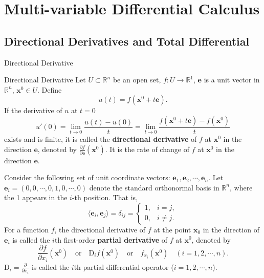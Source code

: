 \documentclass[11pt]{../../TexTemplate/elegantbook}
\begin{document}
\chapter{Multi-variable Differential Calculus}
\section{Directional Derivatives and Total Differential}
\begin{leftbarTitle}{Directional Derivative}\end{leftbarTitle}
\begin{definition}{Directional Derivative}
    Let \(U\subset \mathbb{R}^n\) be an open set, \(f: U\to \mathbb{R}^{1}\),
    \(\mathbf{e}\) is a unit vector in \(\mathbb{R}^{n}\), \(\mathbf{x}^{0}\in U\). Define
    \[
    u(t) = f(\mathbf{x}^{0} + t\mathbf{e}).
    \]
    If the derivative of \(u\) at \(t=0\) 
    \[ 
        u'(0) = \lim_{t \to 0} \frac{u(t) - u(0)}{t} = 
        \lim_{t \to 0} \frac{f(\mathbf{x}^{0} + t\mathbf{e}) - f(\mathbf{x}^{0})}{t} 
    \] 
    exists and is finite, 
    it is called the \textbf{directional derivative} of \(f\) at \(\mathbf{x}^{0}\) in the direction \(\mathbf{e}\), 
    denoted by \(\frac{\partial f}{\partial \mathbf{e}}(\mathbf{x}^{0})\). 
    It is the rate of change of \(f\) at \(\mathbf{x}^{0}\) in the direction \(\mathbf{e}\).
\end{definition}

Consider the following set of unit coordinate vectors: \(\mathbf{e}_{1},\mathbf{e}_{2},\cdots,\mathbf{e}_{n}\).
Let \(\mathbf{e}_{i}=\left( 0, 0, \cdots, 0, 1, 0, \cdots, 0 \right)  \) denote the standard orthonormal basis 
in \(\mathbb{R}^{n}\), where the 1 appears in the \(i\)-th position. That is,
\[
    \langle \mathbf{e}_{i}, \mathbf{e}_{j} \rangle = \delta_{i j} = \begin{cases}
    1, & i = j, \\
    0, & i \neq j.
    \end{cases}
\]
For a function \( f \), the directional derivative of \( f \) at the point \( \mathbf{x}_{0} \) 
in the direction of \( \mathbf{e}_{i} \) 
is called the \( i \)th first-order \textbf{partial derivative} of \( f \) at \(\mathbf{x}^{0}\), denoted by
\[
\frac{\partial f}{\partial x_i}(\mathbf{x}^{0}) \quad \text{or} 
\quad \mathrm{D}_i f(\mathbf{x}^{0})  \quad \text{or} 
\quad f_{x_i}(\mathbf{x}^{0}) \quad (i = 1, 2, \cdots, n).
\]
\( \mathrm{D}_i = \frac{\partial}{\partial x_i} \) is called the \( i \)th partial differential operator (\( i = 1, 2, \cdots, n \)).
\end{document}
